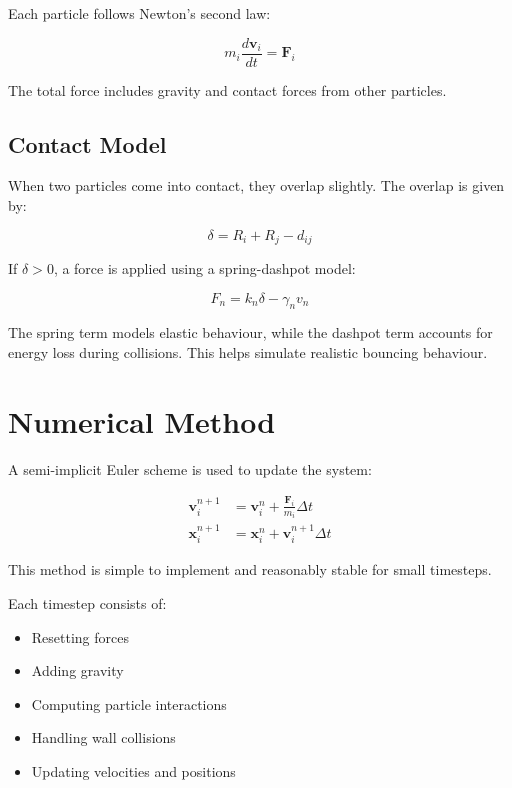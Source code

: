 \documentclass[conference]{IEEEtran}
\begin{document}
Each particle follows Newton's second law:

\begin{equation}
m_i \frac{d\mathbf{v}_i}{dt} = \mathbf{F}_i
\end{equation}

The total force includes gravity and contact forces from other particles.

\subsection{Contact Model}

When two particles come into contact, they overlap slightly. The overlap is given by:

\begin{equation}
\delta = R_i + R_j - d_{ij}
\end{equation}

If $\delta > 0$, a force is applied using a spring-dashpot model:

\begin{equation}
F_n = k_n \delta - \gamma_n v_n
\end{equation}

The spring term models elastic behaviour, while the dashpot term accounts
for energy loss during collisions. This helps simulate realistic bouncing behaviour.

\section{Numerical Method}

A semi-implicit Euler scheme is used to update the system:

\begin{align}
\mathbf{v}_i^{n+1} &= \mathbf{v}_i^n + \frac{\mathbf{F}_i}{m_i}\Delta t \\
\mathbf{x}_i^{n+1} &= \mathbf{x}_i^n + \mathbf{v}_i^{n+1}\Delta t
\end{align}

This method is simple to implement and reasonably stable for small timesteps.

Each timestep consists of:
\begin{itemize}
\item Resetting forces
\item Adding gravity
\item Computing particle interactions
\item Handling wall collisions
\item Updating velocities and positions
\end{itemize}
\end{document}
